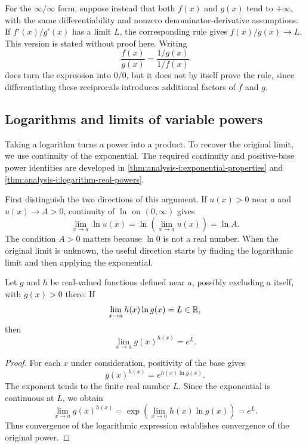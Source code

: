For the $\infty/\infty$ form, suppose instead that both $f(x)$ and
$g(x)$ tend to $+\infty$, with the same differentiability and nonzero
denominator-derivative assumptions. If $f'(x)/g'(x)$ has a limit $L$,
the corresponding rule gives $f(x)/g(x)\to L$. This version is stated
without proof here. Writing
\[
  \frac{f(x)}{g(x)}=\frac{1/g(x)}{1/f(x)}
\]
does turn the expression into $0/0$, but it does not by itself prove
the rule, since differentiating these reciprocals introduces additional
factors of $f$ and $g$.

\subsection{Logarithms and limits of variable powers}

Taking a logarithm turns a power into a product. To recover the original
limit, we use continuity of the exponential. The required continuity and
positive-base power identities are developed in
\autoref{thm:analysis-i:exponential-properties} and
\autoref{thm:analysis-i:logarithm-real-powers}.

First distinguish the two directions of this argument. If $u(x)>0$ near
$a$ and $u(x)\to A>0$, continuity of $\ln$ on $(0,\infty)$ gives
\[
  \lim_{x\to a}\ln u(x)
    =\ln\left(\lim_{x\to a}u(x)\right)=\ln A.
\]
The condition $A>0$ matters because $\ln0$ is not a real number.
When the original limit is unknown, the useful direction starts by
finding the logarithmic limit and then applying the exponential.

\begin{proposition}
  \label{thm:analysis-i:logarithmic-power-limits}
  Let $g$ and $h$ be real-valued functions defined near $a$, possibly
  excluding $a$ itself, with $g(x)>0$ there. If
  \[
    \lim_{x\to a}h(x)\ln g(x)=L\in\mathbb{R},
  \]
  then
  \[
    \lim_{x\to a}g(x)^{h(x)}=e^L.
  \]
\end{proposition}
\begin{proof}
  For each $x$ under consideration, positivity of the base gives
  \[
    g(x)^{h(x)}=e^{h(x)\ln g(x)}.
  \]
  The exponent tends to the finite real number $L$. Since the exponential
  is continuous at $L$, we obtain
  \[
    \lim_{x\to a}g(x)^{h(x)}
      =\exp\left(\lim_{x\to a}h(x)\ln g(x)\right)=e^L.
  \]
  Thus convergence of the logarithmic expression establishes convergence
  of the original power.
\end{proof}

